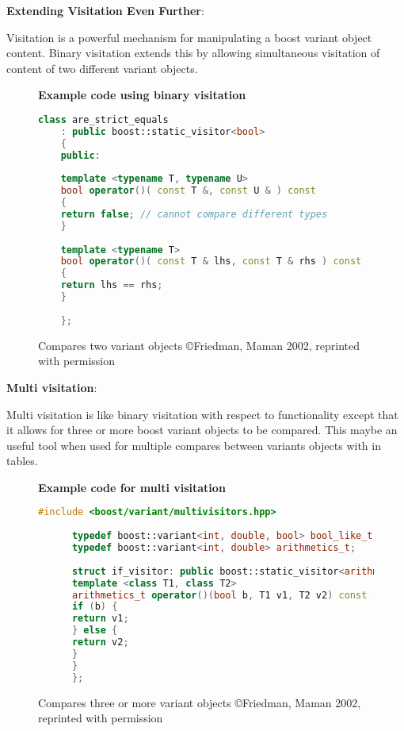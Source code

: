 \documentclass[letterpaper, 12pt]{article}
\begin{document}
{\bfseries Extending Visitation Even Further}:
\par\vspace{\baselineskip}
Visitation is a powerful mechanism for manipulating a boost variant object content. Binary visitation
extends this by allowing simultaneous visitation of content of two different variant objects.
\par\vspace{\baselineskip}

\begin{figure}
  \centering
  \textbf{Example code using binary visitation}
  	\begin{lstlisting}[language=C++]
  	class are_strict_equals
  	: public boost::static_visitor<bool>
  	{
  	public:
  	
  	template <typename T, typename U>
  	bool operator()( const T &, const U & ) const
  	{
  	return false; // cannot compare different types
  	}
  	
  	template <typename T>
  	bool operator()( const T & lhs, const T & rhs ) const
  	{
  	return lhs == rhs;
  	}
  	
  	};
  	\end{lstlisting}
  \cite{boostvariant}
  \caption{Compares two variant objects \copyright Friedman, Maman 2002, reprinted with permission} \label{binvisitation}
\end{figure}

\newpage
{\bfseries Multi visitation}:
\par\vspace{\baselineskip}
Multi visitation is like binary visitation with respect to functionality except that it allows for
three or more boost variant objects to be compared. This maybe an useful tool when used for
multiple compares between variants objects with in tables.

\begin{figure}
  \centering
  \textbf{Example code for multi visitation}

	\begin{lstlisting}[language=C++, basicstyle=\tiny]
	  #include <boost/variant/multivisitors.hpp>
	  
	  typedef boost::variant<int, double, bool> bool_like_t;
	  typedef boost::variant<int, double> arithmetics_t;
	  
	  struct if_visitor: public boost::static_visitor<arithmetics_t> {
	  template <class T1, class T2>
	  arithmetics_t operator()(bool b, T1 v1, T2 v2) const {
	  if (b) {
	  return v1;
	  } else {
	  return v2;
	  }
	  }
	  };
	\end{lstlisting}
  \cite{boostvariant}
  \caption{Compares three or more variant objects \copyright Friedman, Maman 2002, reprinted with permission} \label{multivisitation}
\end{figure}
\end{document}
